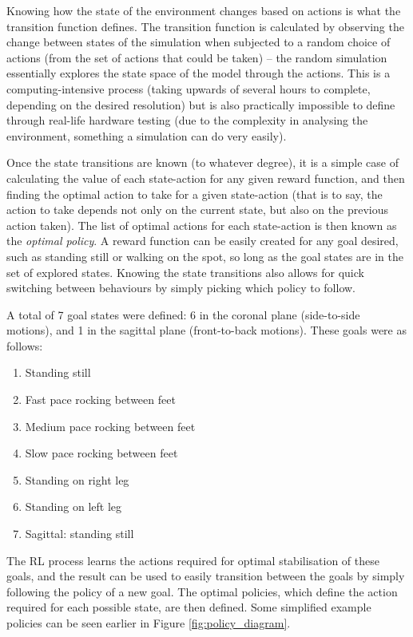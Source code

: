 Knowing how the state of the environment changes based on actions is what the transition function defines. The transition function is calculated by observing the change between states of the simulation when subjected to a random choice of actions (from the set of actions that could be taken) -- the random simulation essentially explores the state space of the model through the actions. This is a computing-intensive process (taking upwards of several hours to complete, depending on the desired resolution) but is also practically impossible to define through real-life hardware testing (due to the complexity in analysing the environment, something a simulation can do very easily).

Once the state transitions are known (to whatever degree), it is a simple case of calculating the value of each state-action for any given reward function, and then finding the optimal action to take for a given state-action (that is to say, the action to take depends not only on the current state, but also on the previous action taken). The list of optimal actions for each state-action is then known as the \textit{optimal policy}. A reward function can be easily created for any goal desired, such as standing still or walking on the spot, so long as the goal states are in the set of explored states. Knowing the state transitions also allows for quick switching between behaviours by simply picking which policy to follow.

A total of 7 goal states were defined: 6 in the coronal plane (side-to-side motions), and 1 in the sagittal plane (front-to-back motions). These goals were as follows:

\begin{enumerate}
\item Standing still
\item Fast pace rocking between feet
\item Medium pace rocking between feet
\item Slow pace rocking between feet
\item Standing on right leg
\item Standing on left leg
\item Sagittal: standing still
\end{enumerate}

The RL process learns the actions required for optimal stabilisation of these goals, and the result can be used to easily transition between the goals by simply following the policy of a new goal. The optimal policies, which define the action required for each possible state, are then defined. Some simplified example policies can be seen earlier in Figure \ref{fig:policy_diagram}.

